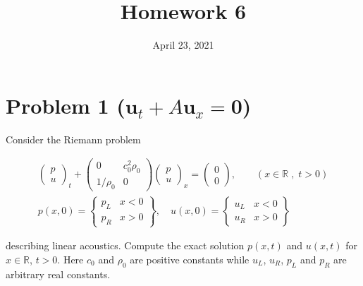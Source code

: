 \documentclass[
  11pt,
]{article}
\title{Homework 6}
\author{}
\date{April 23, 2021}
\renewenvironment{quote}%
{%
\definecolor{shadecolor}{rgb}{0.96,0.96,0.96}%
\begin{shaded*}\quoting[leftmargin=0pt, vskip=0pt]
}%
{\endquoting\end{shaded*}}
\begin{document}
\maketitle

{
\hypersetup{linkcolor=}
\setcounter{tocdepth}{3}
\tableofcontents
}

\pagebreak

\hypertarget{problem-1-mathbfu_t-a-mathbfu_x-mathbf0}{%
\section{\texorpdfstring{Problem 1
(\(\mathbf{u}_t + A \mathbf{u}_x = \mathbf{0}\))}{Problem 1 (\textbackslash mathbf\{u\}\_t + A \textbackslash mathbf\{u\}\_x = \textbackslash mathbf\{0\})}}\label{problem-1-mathbfu_t-a-mathbfu_x-mathbf0}}

\begin{quote}
Consider the Riemann problem

\[
\begin{gathered}
\begin{pmatrix} p \\ u \end{pmatrix}_t +
\begin{pmatrix} 0 & c_0^2\rho_0 \\ 1/\rho_0 & 0 \end{pmatrix}
\begin{pmatrix} p \\ u \end{pmatrix}_x =
\begin{pmatrix} 0 \\ 0 \end{pmatrix}, \qquad (x\in\mathbb R\;,\; t>0) \\[5pt]
p(x,0)=\left\{ \begin{array}{cc} p_L & x<0 \\ p_R & x>0 \end{array}\right\}, \quad
u(x,0)=\left\{ \begin{array}{cc} u_L & x<0 \\ u_R & x>0 \end{array}\right\}
\end{gathered}
\]

describing linear acoustics. Compute the exact solution \(p(x,t)\) and
\(u(x,t)\) for \(x\in\mathbb R\), \(t>0\). Here \(c_0\) and \(\rho_0\)
are positive constants while \(u_L\), \(u_R\), \(p_L\) and \(p_R\) are
arbitrary real constants.
\end{quote}
\end{document}
